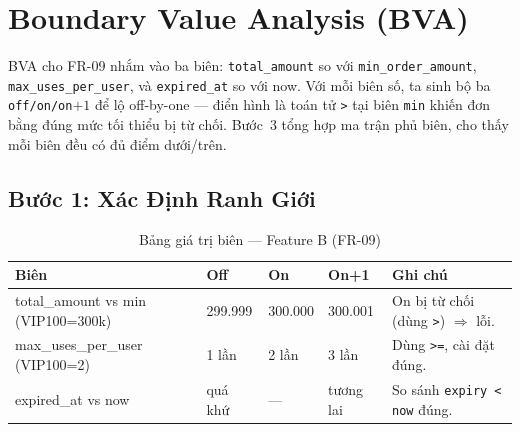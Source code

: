 \documentclass[12pt, a4paper]{report}
\begin{document}
\section{Boundary Value Analysis (BVA)}

BVA cho FR-09 nhắm vào ba biên: \texttt{total\_amount} so với \texttt{min\_order\_amount},
\texttt{max\_uses\_per\_user}, và \texttt{expired\_at} so với now. Với mỗi biên số, ta sinh
bộ ba \texttt{off/on/on$+1$} để lộ off-by-one --- điển hình là toán tử \texttt{>} tại biên
\texttt{min} khiến đơn bằng đúng mức tối thiểu bị từ chối. Bước~3 tổng hợp ma trận phủ biên, cho
thấy mỗi biên đều có đủ điểm dưới/trên.

\subsection{Bước 1: Xác Định Ranh Giới}
\begin{table}[H]
    \centering
    \caption{Bảng giá trị biên — Feature B (FR-09)}
    \begin{tabularx}{\linewidth}{L{3.4cm} C{1.8cm} C{1.8cm} C{1.8cm} X}
        \toprule
        \textbf{Biên} & \textbf{Off} & \textbf{On} & \textbf{On+1} & \textbf{Ghi chú} \\
        \midrule
        total\_amount vs min (VIP100=300k) & 299.999 & 300.000 & 300.001 & On bị từ chối (dùng \texttt{>}) $\Rightarrow$ lỗi. \\
        max\_uses\_per\_user (VIP100=2) & 1 lần & 2 lần & 3 lần & Dùng \texttt{>=}, cài đặt đúng. \\
        expired\_at vs now & quá khứ & --- & tương lai & So sánh \texttt{expiry < now} đúng. \\
        \bottomrule
    \end{tabularx}
\end{table}
\end{document}
